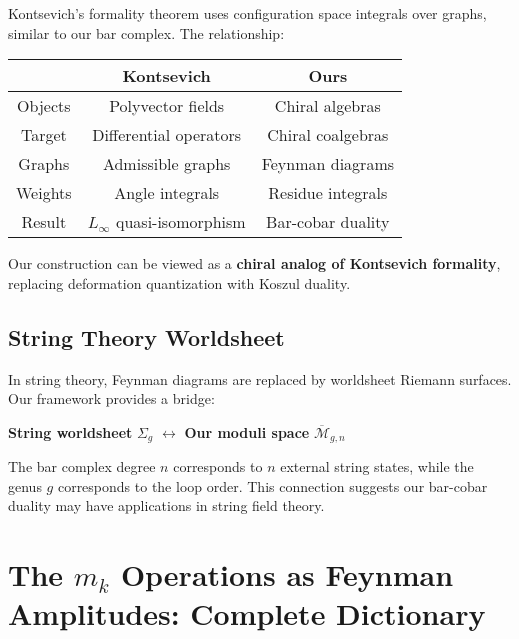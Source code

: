 \begin{remark}\label{rem:kontsevich-graphs}
Kontsevich's formality theorem \cite{Kon99} uses configuration space integrals 
over graphs, similar to our bar complex. The relationship:

\begin{center}
\begin{tabular}{c|c|c}
& \textbf{Kontsevich} & \textbf{Ours} \\
\hline
Objects & Polyvector fields & Chiral algebras \\
Target & Differential operators & Chiral coalgebras \\
Graphs & Admissible graphs & Feynman diagrams \\
Weights & Angle integrals & Residue integrals \\
Result & $L_\infty$ quasi-isomorphism & Bar-cobar duality
\end{tabular}
\end{center}

Our construction can be viewed as a \textbf{chiral analog of Kontsevich formality}, 
replacing deformation quantization with Koszul duality.
\end{remark}

\subsection{String Theory Worldsheet}

\begin{remark}\label{rem:worldsheet-vs-config}
In string theory, Feynman diagrams are replaced by worldsheet Riemann surfaces. 
Our framework provides a bridge:

\textbf{String worldsheet} $\Sigma_g$ $\leftrightarrow$ \textbf{Our moduli space} 
$\overline{\mathcal{M}}_{g,n}$

The bar complex degree $n$ corresponds to $n$ external string states, while the 
genus $g$ corresponds to the loop order. This connection suggests our bar-cobar 
duality may have applications in string field theory.
\end{remark}


\section{The $m_k$ Operations as Feynman Amplitudes: Complete Dictionary}
\label{sec:mk-feynman-complete}

